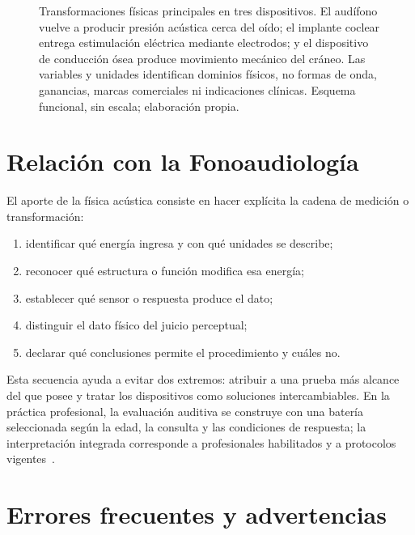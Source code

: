 \begin{figure}[htbp]
    \centering
    \resizebox{\textwidth}{!}{%
    }
    \caption{Transformaciones físicas principales en tres dispositivos. El
    audífono vuelve a producir presión acústica cerca del oído; el implante
    coclear entrega estimulación eléctrica mediante electrodos; y el
    dispositivo de conducción ósea produce movimiento mecánico del cráneo.
    Las variables y unidades identifican dominios físicos, no formas de onda,
    ganancias, marcas comerciales ni indicaciones clínicas. Esquema
    funcional, sin escala; elaboración propia.}
    \label{fig:u8-cadenas-dispositivos}
\end{figure}

\section{Relación con la Fonoaudiología}
\label{sec:u8-relacion-fonoaudiologia}

El aporte de la física acústica consiste en hacer explícita la cadena de
medición o transformación:

\begin{enumerate}
    \item identificar qué energía ingresa y con qué unidades se describe;
    \item reconocer qué estructura o función modifica esa energía;
    \item establecer qué sensor o respuesta produce el dato;
    \item distinguir el dato físico del juicio perceptual;
    \item declarar qué conclusiones permite el procedimiento y cuáles no.
\end{enumerate}

Esta secuencia ayuda a evitar dos extremos: atribuir a una prueba más alcance
del que posee y tratar los dispositivos como soluciones intercambiables.
En la práctica profesional, la evaluación auditiva se construye con
una batería seleccionada según la edad, la consulta y las condiciones de
respuesta; la interpretación integrada corresponde a profesionales
habilitados y a protocolos vigentes~\cite{ashaHearingAdults}.

\section{Errores frecuentes y advertencias}
\label{sec:u8-errores}

